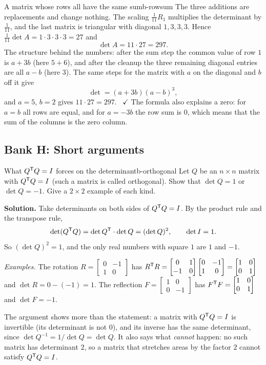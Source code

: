 \documentclass[11pt]{article}
\begin{document}
\begin{exmp}{A matrix whose rows all have the same sum}{b-rowsum}
The three additions are replacements and change nothing. The scaling $\tfrac1{11}R_1$ multiplies the determinant by $\tfrac1{11}$, and the last matrix is triangular with diagonal $1,3,3,3$. Hence $\tfrac1{11}\det A=1\cdot3\cdot3\cdot3=27$ and
\[
\det A=11\cdot27=297.
\]
The structure behind the numbers: after the sum step the common value of row $1$ is $a+3b$ (here $5+6$), and after the cleanup the three remaining diagonal entries are all $a-b$ (here $3$). The same steps for the matrix with $a$ on the diagonal and $b$ off it give
\[
\det=(a+3b)(a-b)^3,
\]
and $a=5$, $b=2$ gives $11\cdot27=297$. \ $\checkmark$ The formula also explains a zero: for $a=b$ all rows are equal, and for $a=-3b$ the row sum is $0$, which means that the sum of the columns is the zero column.
\end{exmp}

\subsection*{Bank H: Short arguments}

\begin{exmp}{What $Q^{\mathsf T} Q=I$ forces on the determinant}{b-orthogonal}
Let $Q$ be an $n\times n$ matrix with $Q^{\mathsf T} Q=I$ (such a matrix is called orthogonal). Show that $\det Q=1$ or $\det Q=-1$. Give a $2\times2$ example of each kind.

\textbf{Solution.} Take determinants on both sides of $Q^{\mathsf T} Q=I$. By the product rule and the transpose rule,
\[
\det(Q^{\mathsf T} Q)=\det Q^{\mathsf T}\cdot\det Q=(\det Q)^2,\qquad\det I=1.
\]
So $(\det Q)^2=1$, and the only real numbers with square $1$ are $1$ and $-1$.

\emph{Examples.} The rotation $R=\begin{bmatrix}0&-1\\1&0\end{bmatrix}$ has $R^{\mathsf T} R=\begin{bmatrix}0&1\\-1&0\end{bmatrix}\begin{bmatrix}0&-1\\1&0\end{bmatrix}=\begin{bmatrix}1&0\\0&1\end{bmatrix}$ and $\det R=0-(-1)=1$. The reflection $F=\begin{bmatrix}1&0\\0&-1\end{bmatrix}$ has $F^{\mathsf T} F=\begin{bmatrix}1&0\\0&1\end{bmatrix}$ and $\det F=-1$.

The argument shows more than the statement: a matrix with $Q^{\mathsf T} Q=I$ is invertible (its determinant is not $0$), and its inverse has the same determinant, since $\det Q^{-1}=1/\det Q=\det Q$. It also says what \emph{cannot} happen: no such matrix has determinant $2$, so a matrix that stretches areas by the factor $2$ cannot satisfy $Q^{\mathsf T} Q=I$.
\end{exmp}
\end{document}
